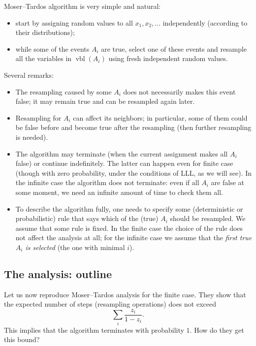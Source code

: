 \documentclass[12pt]{article}
\DeclareMathOperator{\vbl}{\mathrm{vbl}}
\begin{document}
\medskip\noindent
Moser--Tardos algorithm is very simple and natural:

\begin{itemize}
\item start by assigning random values to all $x_1,x_2,\ldots$ independently (according to their distributions);
\item while some of the events $A_i$ are true, select one of these events and resample all the variables in $\vbl(A_i)$ using fresh independent random values.
\end{itemize}

\noindent
Several remarks:

\begin{itemize}

\item The resampling caused by some $A_i$ does not necessarily makes this event false; it may remain true and can be resampled again later.

\item Resampling for $A_i$ can affect its neighbors; in particular, some of them could be false before and become true after the resampling (then further resampling is needed).

\item The algorithm may terminate (when the current assignment makes all $A_i$ false) or continue indefinitely. The latter can happen even for finite case (though with zero probability, under the conditions of LLL, as we will see). In the infinite case the algorithm does not terminate: even if all $A_i$ are false at some moment, we need an infinite amount of time to check them all.

\item To describe the algorithm fully, one needs to specify some (deterministic or probabilistic) rule that says which of the (true) $A_i$ should be resampled. We assume that some rule is fixed. In the finite case the choice of the rule does not affect the analysis at all; for the infinite case we assume that the \emph{first true $A_i$ is selected} (the one with minimal $i$).

\end{itemize}

\subsection{The analysis: outline}
Let us now reproduce Moser--Tardos analysis for the finite case. They show that the expected number of steps (resampling operations) does not exceed
   $$\sum_i \frac{z_i}{1-z_i}.$$
This implies that the algorithm terminates with probability $1$. How do they get this bound?
\end{document}

